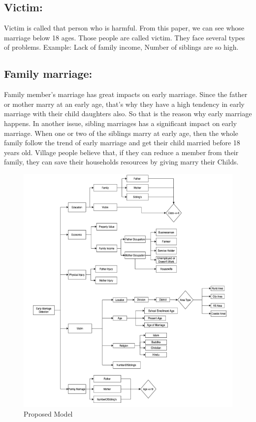 \documentclass{article}
\begin{document}
    \subsection{Victim:  }
        Victim is called that person who is harmful. From this paper, we can see whose marriage below 18 ages. Those people are called victim. They face several types of problems. Example: Lack of family income, Number of siblings are so high. 
    \subsection{Family marriage:  }
        Family member’s marriage has great impacts on early marriage. Since the father or mother marry at an early age, that’s why they have a high tendency in early marriage with their child daughters also. So that is the reason why early marriage happens. In another issue, sibling marriages has a significant impact on early marriage. When one or two of the siblings marry at early age, then the whole family follow the trend of early marriage and get their child married before 18 years old. Village people believe that, if they can reduce a member from their family, they can save their households resources by giving marry their Childs. 
        \begin{figure}[!htb]
            \includegraphics[width=1\textwidth]{Images/figure2.png}
            \caption{Proposed Model}
        \end{figure} 
\end{document}
